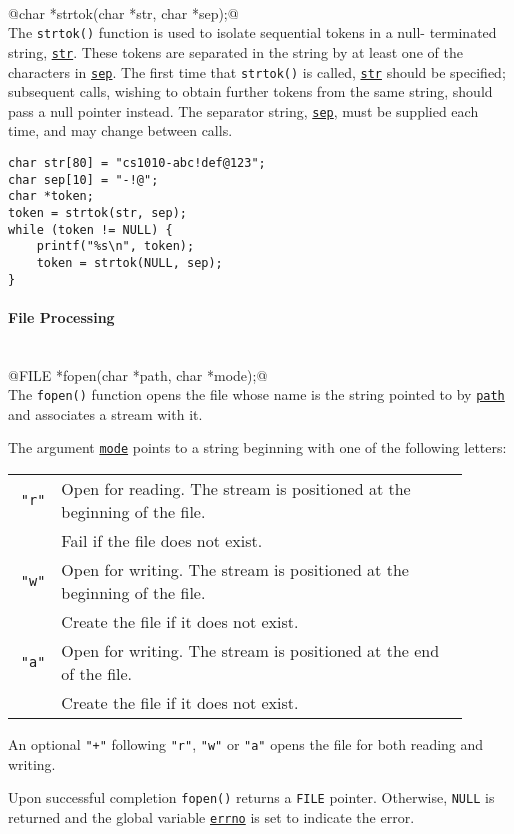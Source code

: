 \documentclass[11pt,twocolumn]{scrartcl}
\newcommand{\ul}[1]{\underline{\texttt{#1}}}
\begin{document}
\hfill\\
@char *strtok(char *str, char *sep);@\\
The \verb|strtok()| function is used to isolate sequential tokens in a null-
terminated string, \ul{str}.  These tokens are separated in the string by at
least one of the characters in \ul{sep}.  The first time that \verb|strtok()| is
called, \ul{str} should be specified; subsequent calls, wishing to obtain
further tokens from the same string, should pass a null pointer instead.
The separator string, \ul{sep}, must be supplied each time, and may change
between calls.
\begin{lstlisting}
char str[80] = "cs1010-abc!def@123";
char sep[10] = "-!@";
char *token;
token = strtok(str, sep);
while (token != NULL) {
    printf("%s\n", token);
    token = strtok(NULL, sep);
}
\end{lstlisting}

\newpage
\paragraph{File Processing}\hfill\\
@FILE *fopen(char *path, char *mode);@\\
The \verb|fopen()| function opens the file whose name is the string pointed to
by \ul{path} and associates a stream with it.

The argument \ul{mode} points to a string beginning with one of the following
letters:

\begin{tabular}{r p{0.9\linewidth}}
    \verb|"r"| &Open for reading.  The stream is positioned at the beginning of the file. \\
               &Fail if the file does not exist.  \\
    \verb|"w"| &Open for writing.  The stream is positioned at the beginning of the file. \\
               &Create the file if it does not exist.  \\
    \verb|"a"| &Open for writing.  The stream is positioned at the end of the file. \\
               &Create the file if it does not exist.
\end{tabular}
An optional \verb|"+"| following \verb|"r"|, \verb|"w"| or \verb|"a"| opens the file for both
reading and writing.

Upon successful completion \verb|fopen()| returns a \verb|FILE|
pointer.  Otherwise, \verb|NULL| is returned and the global variable \ul{errno} is
set to indicate the error.
\end{document}
